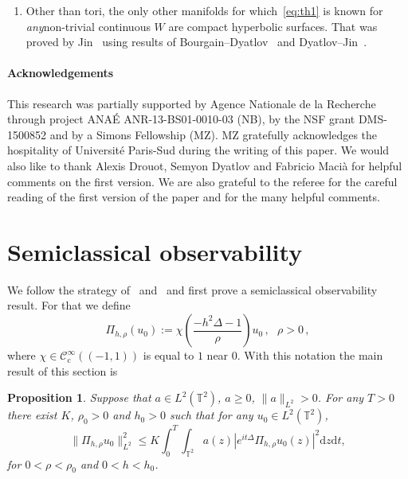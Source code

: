 \documentclass[11pt]{article}
\newtheorem*{remas*}{Remarks}
\newtheorem{prop}[theo]{Proposition}
\theoremstyle{definition}
\newcommand{\pointir}{.\ ---\ }
\numberwithin{equation}{section}
\numberwithin{figure}{section}
\numberwithin{table}{section}
\newcommand{\CIc}{{\mathcal C}^\infty_{\mathrm{c}} }
\newcommand{\TT}{{\mathbb T}}
\newcommand*{\dd}{\mathrm{d}}
\newcommand*{\dz}{\dd z}
\newcommand*{\dt}{\dd t}
\newenvironment{remasc*}{\let\pointir\relax \begin{remas*}}{\end{remas*}}
\begin{document}
\begin{remasc*}
\begin{enumerate}
\item \label{rem4} Other than tori, the only other manifolds for which~\eqref{eq:th1} is known for \emph{any}\linebreak non-trivial continuous $ W $ are compact hyperbolic surfaces. That was proved by Jin~\cite{Ji} using results of Bourgain--Dyatlov~\cite{BD} and Dyatlov--Jin~\cite{DJ}.
\end{enumerate}
\end{remasc*}

\paragraph*{Acknowledgements}
This research was partially supported by Agence Nationale de la Recherche through project ANAÉ ANR-13-BS01-0010-03 (NB), by the NSF grant DMS-1500852 and by a Simons Fellowship (MZ). MZ gratefully acknowledges the hospitality of Université Paris-Sud during the writing of this paper. We would also like to thank Alexis Drouot, Semyon Dyatlov and Fabricio Macià for helpful comments on the first version. We are also grateful to the referee for the careful reading of the first version of the paper and for the many helpful comments.


\section{Semiclassical observability}

We follow the strategy of~\cite{BZ4} and~\cite{BBZ} and first prove a semiclassical observability result. For that we define
\begin{equation}\label{eq:Pih}
\Pi_{h, \rho} (u_0) := \chi \left(\frac{ - h^2\Delta - 1} {\rho} \right) u_0\,, \ \ \ \rho > 0 \,,
\end{equation}
where $ \chi \in \CIc ((- 1, 1))$ is equal to $ 1 $ near $ 0 $. With this notation the main result of this section is
\begin{prop}\label{p:semi}
Suppose that $ a \in L^2 (\TT^2) $, $ a \geq 0 $, $ \| a \|_{L^2} > 0 $. For any $ T > 0 $ there exist $ K $, $ \rho_0 > 0 $ and $ h_0 > 0 $ such that for any $ u_0 \in L^2 (\TT^2) $,
\begin{equation}\label{eq:semi}
\| \Pi_{h, \rho} u_0 \|_{ L^2 }^2 \leq K \int_0^T \!\!\int_{ \TT^2} a (z) | e^{ i t \Delta} \Pi_{h, \rho} u_0 (z) |^2 \dz \dt,
\end{equation}
for $ 0 < \rho < \rho_0 $ and $ 0 < h < h_0 $.
\end{prop}
\end{document}
